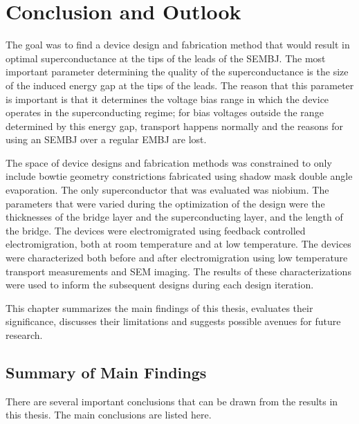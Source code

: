 \section{Conclusion and Outlook}
\label{section:Conclusion}





The goal was to find a device design and fabrication method that would result in optimal superconductance at the tips of the leads of the SEMBJ. The most important parameter determining the quality of the superconductance is the size of the induced energy gap at the tips of the leads. The reason that this parameter is important is that it determines the voltage bias range in which the device operates in the superconducting regime; for bias voltages outside the range determined by this energy gap, transport happens normally and the reasons for using an SEMBJ over a regular EMBJ are lost. 

The space of device designs and fabrication methods was constrained to only include bowtie geometry constrictions fabricated using shadow mask double angle evaporation. The only superconductor that was evaluated was niobium. The parameters that were varied during the optimization of the design were the thicknesses of the bridge layer and the superconducting layer, and the length of the bridge. The devices were electromigrated using feedback controlled electromigration, both at room temperature and at low temperature. The devices were characterized both before and after electromigration using low temperature transport measurements and SEM imaging. The results of these characterizations were used to inform the subsequent designs during each design iteration. 

This chapter summarizes the main findings of this thesis, evaluates their significance, discusses their limitations and suggests possible avenues for future research. 


\subsection{Summary of Main Findings}

There are several important conclusions that can be drawn from the results in this thesis. The main conclusions are listed here. 

